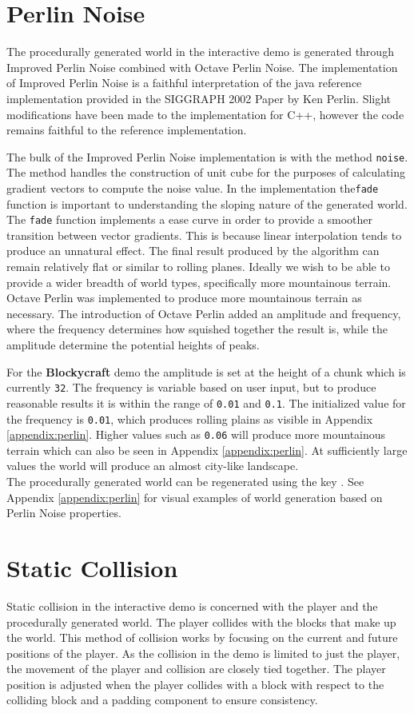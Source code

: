 \documentclass{book}
\newcommand{\Blockycraft}{\textbf{Blockycraft}}
\begin{document}
\section{Perlin Noise}
The procedurally generated world in the interactive demo is generated through Improved Perlin Noise combined with Octave Perlin Noise.  The implementation of Improved Perlin Noise is a faithful interpretation of the java reference implementation provided in the SIGGRAPH 2002 Paper by Ken Perlin.  Slight modifications have been made to the implementation for C++, however the code remains faithful to the reference implementation.

The bulk of the Improved Perlin Noise implementation is with the method \texttt{noise}.  The method handles the construction of unit cube for the purposes of calculating gradient vectors to compute the noise value.  In the implementation the\texttt{fade} function is important to understanding the sloping nature of the generated world.  The \texttt{fade} function implements a ease curve in order to provide a smoother transition between vector gradients.  This is because linear interpolation tends to produce an unnatural effect. The final result produced by the algorithm can remain relatively flat or similar to rolling planes.  Ideally we wish to be able to provide a wider breadth of world types, specifically more mountainous terrain.  Octave Perlin was implemented to produce more mountainous terrain as necessary.  The introduction of Octave Perlin added an amplitude and frequency, where the frequency determines how squished together the result is, while the amplitude determine the potential heights of peaks.
    
For the \Blockycraft{} demo the amplitude is set at the height of a chunk which is currently \texttt{32}.  The frequency is variable based on user input, but to produce reasonable results it is within the range of \texttt{0.01} and \texttt{0.1}.  The initialized value for the frequency is \texttt{0.01}, which produces rolling plains as visible in Appendix \ref{appendix:perlin}.  Higher values such as \texttt{0.06} will produce more mountainous terrain which can also be seen in Appendix \ref{appendix:perlin}.  At sufficiently large values the world will produce an almost city-like landscape.
\\
The procedurally generated world can be regenerated using the key .  See Appendix \ref{appendix:perlin} for visual examples of world generation based on Perlin Noise properties.
    
\section{Static Collision}
Static collision in the interactive demo is concerned with the player and the procedurally generated world.  The player collides with the blocks that make up the world.  This method of collision works by focusing on the current and future positions of the player.  As the collision in the demo is limited to just the player, the movement of the player and collision are closely tied together.  The player position is adjusted when the player collides with a block with respect to the colliding block and a padding component to ensure consistency.
\end{document}
